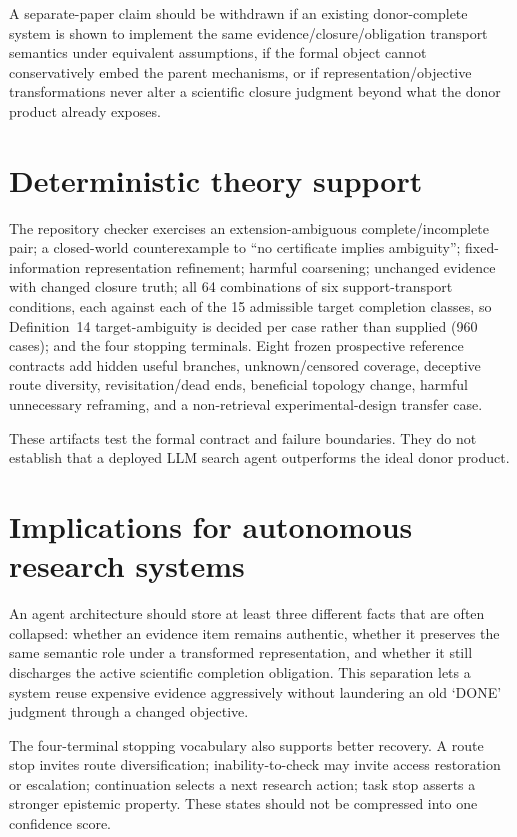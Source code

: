 \documentclass[11pt]{article}
\begin{document}
A separate-paper claim should be withdrawn if an existing donor-complete system is shown to implement the same evidence\slash closure\slash obligation transport semantics under equivalent assumptions, if the formal object cannot conservatively embed the parent mechanisms, or if representation\slash objective transformations never alter a scientific closure judgment beyond what the donor product already exposes.

\section{Deterministic theory support}
The repository checker exercises an extension-ambiguous complete/incomplete pair; a closed-world counterexample to ``no certificate implies ambiguity''; fixed-information representation refinement; harmful coarsening; unchanged evidence with changed closure truth; all 64 combinations of six support-transport conditions, each against each of the 15 admissible target completion classes, so Definition~14 target-ambiguity is decided per case rather than supplied (960 cases); and the four stopping terminals. Eight frozen prospective reference contracts add hidden useful branches, unknown/censored coverage, deceptive route diversity, revisitation/dead ends, beneficial topology change, harmful unnecessary reframing, and a non-retrieval experimental-design transfer case.

These artifacts test the formal contract and failure boundaries. They do not establish that a deployed LLM search agent outperforms the ideal donor product.

\section{Implications for autonomous research systems}
An agent architecture should store at least three different facts that are often collapsed: whether an evidence item remains authentic, whether it preserves the same semantic role under a transformed representation, and whether it still discharges the active scientific completion obligation. This separation lets a system reuse expensive evidence aggressively without laundering an old `DONE' judgment through a changed objective.

The four-terminal stopping vocabulary also supports better recovery. A route stop invites route diversification; inability-to-check may invite access restoration or escalation; continuation selects a next research action; task stop asserts a stronger epistemic property. These states should not be compressed into one confidence score.
\end{document}
